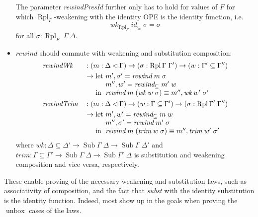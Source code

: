 \documentclass[12pt,twoside,openright]{report}
\numberwithin{equation}{chapter}
\numberwithin{figure}{chapter}
\numberwithin{table}{chapter}
\theoremstyle{definition}\newtheorem{definition}{Definition}
\begin{document}
\begin{itemize}
  The parameter \textit{rewindPresId} further only has to hold for values of $F$ for which
  $\operatorname{Rpl}_F$-weakening with the identity OPE is the identity function, i.e.
  $$ \textit{wk}_{\operatorname{Rpl}_F} \; \textit{id}_\subseteq \; \sigma = \sigma $$
  for all $\sigma : \operatorname{Rpl}_F \; \Gamma \; \Delta$.
\item $\textit{rewind}$ should commute with weakening and substitution composition:
  \begin{align*}
    &\textit{rewindWk} &&: (m : \Delta\lhd\Gamma) \to (\sigma : \operatorname{Rpl} \Gamma \; \Gamma') \to (w : \Gamma' \subseteq \Gamma'') \\
    &&&\to
    \begin{array}[t]{@{}l@{}l@{}}
      \text{let } & m' , \sigma' = \textit{rewind} \; m \; \sigma \\
      & m'' , w' = \textit{rewind}_\subseteq \; m' \; w \\
      \text{in } & \textit{rewind} \; m \; (\textit{wk} \; w \; \sigma) \equiv m'' , \textit{wk} \; w' \; \sigma'
    \end{array} \\
    &\textit{rewindTrim} &&: (m : \Delta\lhd\Gamma) \to (w : \Gamma \subseteq \Gamma') \to (\sigma : \operatorname{Rpl} \Gamma' \; \Gamma'') \\
    &&&\to
    \begin{array}[t]{@{}l@{}l@{}}
      \text{let } & m' , w' = \textit{rewind}_\subseteq \; m \; w \\
      & m'' , \sigma' = \textit{rewind} \; m' \; \sigma \\
      \text{in } & \textit{rewind} \; m \; (\textit{trim} \; w \; \sigma) \equiv m'' , \textit{trim} \; w' \; \sigma'
    \end{array}
  \end{align*}
  where $\textit{wk} : \Delta\subseteq\Delta' \to \operatorname{Sub} \Gamma \; \Delta \to \operatorname{Sub} \Gamma \; \Delta'$ and
  $\textit{trim} : \Gamma\subseteq\Gamma' \to \operatorname{Sub} \Gamma \; \Delta \to \operatorname{Sub} \Gamma' \; \Delta$
  is substitution and weakening composition and vice versa, respectively.
\end{itemize}
These enable proving of the necessary weakening and substitution laws,
such as associativity of composition,
and the fact that \textit{subst} with the identity substitution is the identity function.
Indeed, most show up in the goals when proving the $\operatorname{unbox}$ cases of the laws.
\end{document}
